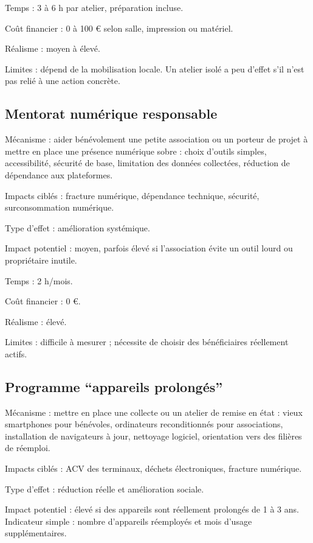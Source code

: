 \documentclass[
  10pt,
  a4paper,
  DIV=11,
  numbers=noendperiod,
  oneside]{scrreprt}
\begin{document}
Temps : 3 à 6 h par atelier, préparation incluse.

Coût financier : 0 à 100 € selon salle, impression ou matériel.

Réalisme : moyen à élevé.

Limites : dépend de la mobilisation locale. Un atelier isolé a peu
d'effet s'il n'est pas relié à une action concrète.

\subsection{Mentorat numérique
responsable}\label{mentorat-numuxe9rique-responsable}

Mécanisme : aider bénévolement une petite association ou un porteur de
projet à mettre en place une présence numérique sobre : choix d'outils
simples, accessibilité, sécurité de base, limitation des données
collectées, réduction de dépendance aux plateformes.

Impacts ciblés : fracture numérique, dépendance technique, sécurité,
surconsommation numérique.

Type d'effet : amélioration systémique.

Impact potentiel : moyen, parfois élevé si l'association évite un outil
lourd ou propriétaire inutile.

Temps : 2 h/mois.

Coût financier : 0 €.

Réalisme : élevé.

Limites : difficile à mesurer ; nécessite de choisir des bénéficiaires
réellement actifs.

\subsection{Programme ``appareils
prolongés''}\label{programme-appareils-prolonguxe9s}

Mécanisme : mettre en place une collecte ou un atelier de remise en état
: vieux smartphones pour bénévoles, ordinateurs reconditionnés pour
associations, installation de navigateurs à jour, nettoyage logiciel,
orientation vers des filières de réemploi.

Impacts ciblés : ACV des terminaux, déchets électroniques, fracture
numérique.

Type d'effet : réduction réelle et amélioration sociale.

Impact potentiel : élevé si des appareils sont réellement prolongés de 1
à 3 ans. Indicateur simple : nombre d'appareils réemployés et mois
d'usage supplémentaires.
\end{document}
